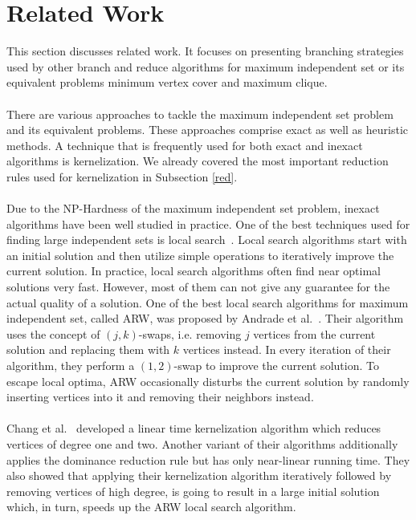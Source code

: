\documentclass[]{article}
\begin{document}
\newpage
\section{Related Work} \label{sec3}

This section discusses related work. It focuses on presenting branching strategies used by other branch and reduce algorithms for maximum independent set or its equivalent problems minimum vertex cover and maximum clique.\paragraph{}

There are various approaches to tackle the maximum independent set problem and its equivalent problems. These approaches comprise exact as well as heuristic methods. A technique that is frequently used for both exact and inexact algorithms is kernelization. We already covered the most important reduction rules used for kernelization in Subsection \ref{red}.

\paragraph{}
 Due to the NP-Hardness of the maximum independent set problem, inexact algorithms have been well studied in practice. One of the best techniques used for finding large independent sets is local search~\cite{bibid}. Local search algorithms start with an initial solution and then utilize simple operations to iteratively improve the current solution. In practice, local search algorithms often find near optimal solutions very fast. However, most of them can not give any guarantee for the actual quality of a solution. One of the best local search algorithms for maximum independent set, called ARW, was proposed by Andrade et al.~\cite{bibid}. Their algorithm uses the concept of $(j,k)$-swaps, i.e. removing $j$ vertices from the current solution and replacing them with $k$ vertices instead. In every iteration of their algorithm, they perform a $(1,2)$-swap to improve the current solution. To escape local optima, ARW occasionally disturbs the current solution by randomly inserting vertices into it and removing their neighbors instead.

\paragraph{}
Chang et al.~\cite{bibid} developed a linear time kernelization algorithm which reduces vertices of degree one and two. Another variant of their algorithms additionally applies the dominance reduction rule but has only near-linear running time. They also showed that applying their kernelization algorithm iteratively followed by removing vertices of high degree, is going to result in a large initial solution which, in turn, speeds up the ARW local search algorithm.
\end{document}
